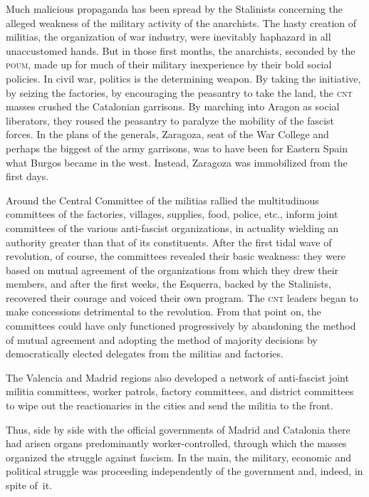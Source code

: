 Much malicious propaganda has been spread by the Stalinists concerning the alleged weakness of the military activity of the anarchists. The hasty creation of militias, the organization of war industry, were inevitably haphazard in all unaccustomed hands. But in those first months, the anarchists, seconded by the \textsc{poum}\kn, made up for much of their military inexperience by their bold social policies. In civil war, politics is the determining weapon. By taking the initiative, by seizing the factories, by encouraging the peasantry to take the land, the \textsc{cnt} masses crushed the Catalonian garrisons. By marching into Aragon as social liberators, they roused the peasantry to paralyze the mobility of the fascist forces. In the plans of the generals, Zaragoza, seat of the War College and perhaps the biggest of the army garrisons, was to have been for Eastern Spain what Burgos became in the west. Instead, Zaragoza was immobilized from the first days.

Around the Central Committee of the militias rallied the multitudinous committees of the factories, villages, supplies, food, police, etc., inform joint committees of the various anti-fascist organizations, in actuality wielding an authority greater than that of its constituents. After the first tidal wave of revolution, of course, the committees revealed their basic weakness: they were based on mutual agreement of the organizations from which they drew their members, and after the first weeks, the Esquerra, backed by the Stalinists, recovered their courage and voiced their own program. The \textsc{cnt} leaders began to make concessions detrimental to the revolution. From that point on, the committees could have only functioned progressively by abandoning the method of mutual agreement and adopting the method of majority decisions by democratically elected delegates from the militias and factories.

The Valencia and Madrid regions also developed a network of anti-fascist joint militia committees, worker patrols, factory committees, and district committees to wipe out the reactionaries in the cities and send the militia to the front.

Thus, side by side with the official governments of Madrid and Catalonia there had arisen organs predominantly worker-controlled, through which the masses organized the struggle against fascism. In the main, the military, economic and political struggle was proceeding independently of the government and, indeed, in spite of~it.

